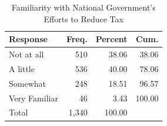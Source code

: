 \documentclass[12pt]{article}
\begin{document}
\begin{table}[H]
\centering
\caption{Familiarity with National Government's Efforts to Reduce Tax}
\label{tab:knowledge}
\begin{tabular}{lrrr}
\hline\hline
Response & Freq. & Percent & Cum. \\
\hline
Not at all    & 510   & 38.06 & 38.06  \\
A little      & 536   & 40.00 & 78.06  \\
Somewhat      & 248   & 18.51 & 96.57  \\
Very Familiar &  46   &  3.43 & 100.00 \\
\hline
Total         & 1,340 & 100.00 &       \\
\hline\hline
\end{tabular}
\end{table}
\end{document}
